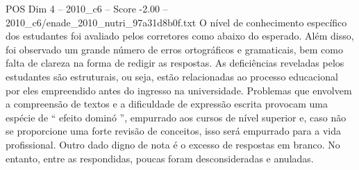 \begin{textsample}{POS Dim 4 – 2010\_c6 – Score -2.00 – 2010\_c6/enade\_2010\_nutri\_97a31d8b0f.txt}
O nível de conhecimento específico dos estudantes foi avaliado pelos corretores como abaixo do esperado.
Além disso, foi observado um grande número de erros ortográficos e gramaticais, bem como falta de clareza na forma de redigir as respostas.
As deficiências reveladas pelos estudantes são estruturais, ou seja, estão relacionadas ao processo educacional por eles empreendido antes do ingresso na universidade.
Problemas que envolvem a compreensão de textos e a dificuldade de expressão escrita provocam uma espécie de “ efeito dominó ”, empurrado aos cursos de nível superior e, caso não se proporcione uma forte revisão de conceitos, isso será empurrado para a vida profissional.
Outro dado digno de nota é o excesso de respostas em branco.
No entanto, entre as respondidas, poucas foram desconsideradas e anuladas.

\end{textsample}
